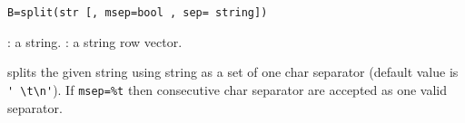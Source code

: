 
\begin{mandesc}
\end{mandesc}
\begin{calling_sequence}
\begin{verbatim}
B=split(str [, msep=bool , sep= string]) 
\end{verbatim}
\end{calling_sequence}

\begin{parameters}
  \begin{varlist}
     : a string.
     : a string row vector.
  \end{varlist}
\end{parameters}

\begin{mandescription}
splits the given string using string as a set of one char separator 
(default value is \verb+' \t\n'+). If \verb+msep=%t+ then consecutive char
separator are accepted as one valid separator. 
\end{mandescription}

\begin{examples}
  \begin{program}
  \end{program}
\end{examples}



